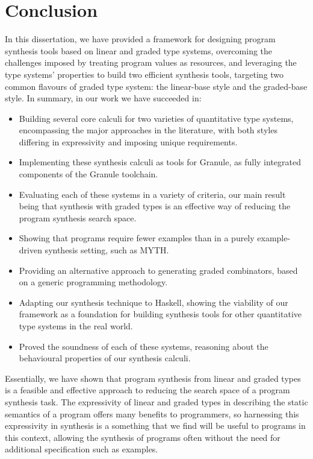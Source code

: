 \chapter{Conclusion}
\label{chapter:conclusion}
In this dissertation, we have provided a framework for designing program
synthesis tools based on linear and graded type systems, overcoming the
challenges imposed by treating program values as resources, and leveraging the
type systems' properties to build two efficient synthesis tools, targeting two
common flavours of graded type system: the linear-base style and the graded-base
style. In summary, in our work we have succeeded in: 
\begin{itemize}
    \item Building several core calculi for two varieties of quantitative type
          systems, encompassing the major approaches in the literature, with
          both styles differing in expressivity and imposing unique
          requirements. 
    \item Implementing these synthesis calculi as tools for Granule, as fully
          integrated 
          components of the Granule toolchain. 
    \item Evaluating each of these systems in a variety of criteria, our main
          result being that synthesis with graded types is an effective way of
          reducing the program synthesis search space.  
    \item Showing that programs require fewer examples than in a purely
          example-driven synthesis setting, such as \textsc{MYTH}. 
    \item Providing an alternative approach to generating graded combinators,
    based on a generic programming methodology. 
    \item Adapting our synthesis technique to Haskell, showing the viability of
          our framework as a foundation for building synthesis tools for other
          quantitative type systems in the real world.
    \item Proved the soundness of each of these systems, reasoning about the
          behavioural properties of our synthesis calculi. 
\end{itemize}

Essentially, we have shown that program synthesis from linear and graded types
is a feasible and effective approach to reducing the search space of a program
synthesis task. The expressivity of linear and graded types in describing the
static semantics of a program offers many benefits to programmers, so
harnessing this expressivity in synthesis is a something that we find will be
useful to programs in this context, allowing the synthesis of programs often
without the need for additional specification such as examples.

